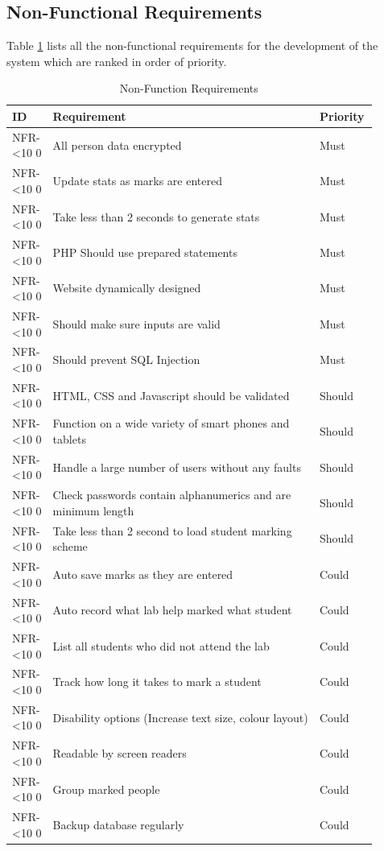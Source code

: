 \documentclass[11pt]{report}
\newcommand{\rid}[1]{\centering #1-\ifnum\value{requirement}<10 0\fi\arabic{requirement}
\stepcounter{requirement}}
\begin{document}
\newpage
\subsection{Non-Functional Requirements} \label{sec:non-func}

Table \ref{table:non-func} lists all the non-functional requirements for the development of the system which are ranked in order of priority.

\begin{spacing}{1.25}
\begin{longtable}{|p{0.1\linewidth}|p{0.7\linewidth}|p{0.1\linewidth}|}
\caption{Non-Function Requirements} \label{table:non-func}\\
\hline
\textbf{ID} & \textbf{Requirement} & \textbf{Priority}\\
\hline \hline


\rid{NFR} & All person data encrypted & Must\\ \hline
\rid{NFR} & Update stats as marks are entered & Must\\ \hline
\rid{NFR} & Take less than 2 seconds to generate stats  & Must\\ \hline
\rid{NFR} & PHP Should use prepared statements & Must\\ \hline
\rid{NFR} & Website dynamically designed & Must\\ \hline
\rid{NFR} & Should make sure inputs are valid & Must\\ \hline
\rid{NFR} & Should prevent SQL Injection & Must\\ \hline


\rid{NFR} & HTML, CSS and Javascript should be validated & Should\\ \hline
\rid{NFR} & Function on a wide variety of smart phones and tablets & Should\\ \hline
\rid{NFR} & Handle a large number of users without any faults & Should\\ \hline
\rid{NFR} & Check passwords contain alphanumerics and are minimum length  & Should\\ \hline
\rid{NFR} & Take less than 2 second to load student marking scheme & Should\\ \hline


\rid{NFR} & Auto save marks as they are entered & Could\\ \hline
\rid{NFR} & Auto record what lab help marked what student & Could\\ \hline
\rid{NFR} & List all students who did not attend the lab & Could\\ \hline
\rid{NFR} & Track how long it takes to mark a student & Could \\ \hline
\rid{NFR} & Disability options (Increase text size, colour layout) & Could\\ \hline
\rid{NFR} & Readable by screen readers & Could\\ \hline
\rid{NFR} & Group marked people & Could \\ \hline
\rid{NFR} & Backup database regularly & Could\\ \hline



\end{longtable}
\end{spacing}
\end{document}
